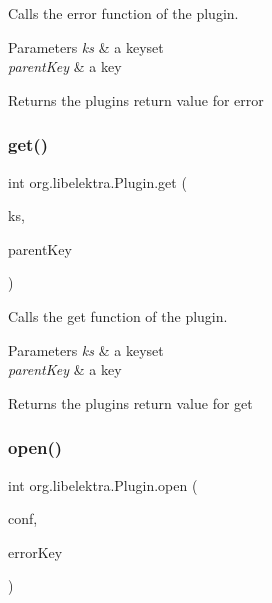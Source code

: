 Calls the error function of the plugin. 


\begin{DoxyParams}{Parameters}
{\em ks} & a keyset \\
\hline
{\em parent\+Key} & a key \\
\hline
\end{DoxyParams}
\begin{DoxyReturn}{Returns}
the plugin\textquotesingle{}s return value for error 
\end{DoxyReturn}
\mbox{\label{interfaceorg_1_1libelektra_1_1Plugin_a9b8362549b7ab8ca5eff39cf6b7c8046}} 
\subsubsection{\texorpdfstring{get()}{get()}}
{\footnotesize\ttfamily int org.\+libelektra.\+Plugin.\+get (\begin{DoxyParamCaption}\item[{\hyperlink{classorg_1_1libelektra_1_1KeySet}{Key\+Set}}]{ks,  }\item[{\hyperlink{classorg_1_1libelektra_1_1Key}{Key}}]{parent\+Key }\end{DoxyParamCaption})}



Calls the get function of the plugin. 


\begin{DoxyParams}{Parameters}
{\em ks} & a keyset \\
\hline
{\em parent\+Key} & a key \\
\hline
\end{DoxyParams}
\begin{DoxyReturn}{Returns}
the plugin\textquotesingle{}s return value for get 
\end{DoxyReturn}
\mbox{\label{interfaceorg_1_1libelektra_1_1Plugin_a740f0602ea62e7a28c86fc801add8907}} 
\subsubsection{\texorpdfstring{open()}{open()}}
{\footnotesize\ttfamily int org.\+libelektra.\+Plugin.\+open (\begin{DoxyParamCaption}\item[{\hyperlink{classorg_1_1libelektra_1_1KeySet}{Key\+Set}}]{conf,  }\item[{\hyperlink{classorg_1_1libelektra_1_1Key}{Key}}]{error\+Key }\end{DoxyParamCaption})}



